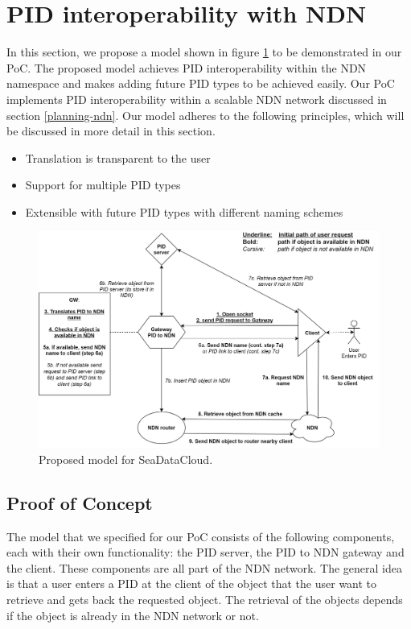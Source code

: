 \section{PID interoperability with NDN}\label{pid-poc}

In this section, we propose a model shown in figure \ref{fig:sdc_model} to be demonstrated in our PoC. The proposed model achieves PID interoperability within the NDN namespace and makes adding future PID types to be achieved easily. Our PoC implements PID interoperability within a scalable NDN network discussed in section \ref{planning-ndn}. Our model adheres to the following principles, which will be discussed in more detail in this section.


\begin{itemize}
    \item{Translation is transparent to the user}
    \item{Support for multiple PID types}
    \item{Extensible with future PID types with different naming schemes}
\end{itemize}

\begin{figure}[H]
\centering
\includegraphics[width=\textwidth]{Images/PIDtoNDN.png}
\caption{Proposed model for SeaDataCloud.}
\label{fig:sdc_model}
\end{figure}

\subsection{Proof of Concept}
The model that we specified for our PoC consists of the following components, each with their own functionality: the PID server, the PID to NDN gateway and the client. These components are all part of the NDN network. The general idea is that a user enters a PID at the client of the object that the user want to retrieve and gets back the requested object. The retrieval of the objects depends if the object is already in the NDN network or not.  

